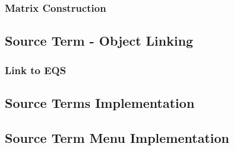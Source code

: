 \subsubsection*{Matrix Construction}


\subsection{Source Term - Object Linking}

\subsubsection*{Link to \textsf{EQS}}

\subsection{Source Terms Implementation}

\subsection{Source Term Menu Implementation}
